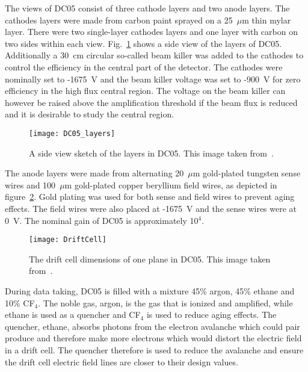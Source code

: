 The views of DC05 consist of three cathode layers and two anode layers.  The
cathodes layers were made from carbon paint sprayed on a 25~$\mu$m thin mylar
layer.  There were two single-layer cathodes layers and one layer with carbon on
two sides within each view.  Fig.~\ref{fig::DC05_layers} shows a side view of
the layers of DC05.  Additionally a 30~cm circular so-called beam killer was
added to the cathodes to control the efficiency in the central part of the
detector.  The cathodes were nominally set to -1675~V and the beam killer
voltage was set to -900~V for zero efficiency in the high flux central region.
The voltage on the beam killer can however be raised above the amplification
threshold if the beam flux is reduced and it is desirable to study the central
region.

\begin{figure}[h!t]
  \centering \texttt{[image: DC05\_layers]}
  \caption{A side view sketch of the layers in DC05.  This image taken
    from~\cite{heitzDC05DNP}.}
  \label{fig::DC05_layers}
\end{figure}

The anode layers were made from alternating 20~$\mu$m gold-plated tungsten sense
wires and 100~$\mu$m gold-plated copper beryllium field wires, as depicted in
figure~\ref{fig:driftcell}.  Gold plating was used for both sense and field
wires to prevent aging effects.  The field wires were also placed at -1675~V and
the sense wires were at 0~V.  The nominal gain of DC05 is approximately 10$^4$.

\begin{figure}
  \centering \texttt{[image: DriftCell]}
  \caption{The drift cell dimensions of one plane in DC05.  This image taken
    from~\cite{heitzDC05DNP}.}
  \label{fig:driftcell}%
\end{figure}

During data taking, DC05 is filled with a mixture 45\% argon, 45\% ethane and
10\% CF$_4$.  The noble gas, argon, is the gas that is ionized and amplified,
while ethane is used as a quencher and CF$_4$ is used to reduce aging effects.
The quencher, ethane, absorbs photons from the electron avalanche which could
pair produce and therefore make more electrons which would distort the electric
field in a drift cell.  The quencher therefore is used to reduce the avalanche
and ensure the drift cell electric field lines are closer to their design
values.


